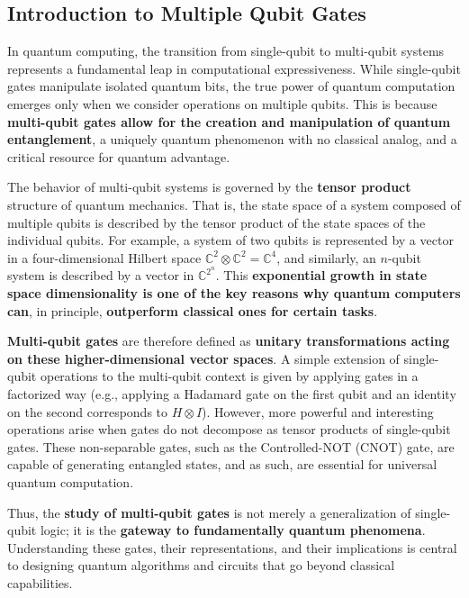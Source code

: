 \subsection{Introduction to Multiple Qubit Gates}

In quantum computing, the transition from single-qubit to multi-qubit systems represents a fundamental leap in computational expressiveness. While single-qubit gates manipulate isolated quantum bits, the true power of quantum computation emerges only when we consider operations on multiple qubits. This is because \textbf{multi-qubit gates allow for the creation and manipulation of quantum entanglement}, a uniquely quantum phenomenon with no classical analog, and a critical resource for quantum advantage.

\highspace
The behavior of multi-qubit systems is governed by the \textbf{tensor product} structure of quantum mechanics. That is, the state space of a system composed of multiple qubits is described by the tensor product of the state spaces of the individual qubits. For example, a system of two qubits is represented by a vector in a four-dimensional Hilbert space $ \mathbb{C}^{2} \otimes \mathbb{C}^{2} = \mathbb{C}^{4} $, and similarly, an $n$-qubit system is described by a vector in $ \mathbb{C}^{2^{n}} $. This \textbf{exponential growth in state space dimensionality is one of the key reasons why quantum computers can}, in principle, \textbf{outperform classical ones for certain tasks}.

\highspace
\textbf{Multi-qubit gates} are therefore defined as \textbf{unitary transformations acting on these higher-dimensional vector spaces}. A simple extension of single-qubit operations to the multi-qubit context is given by applying gates in a factorized way (e.g., applying a Hadamard gate on the first qubit and an identity on the second corresponds to $ H \otimes I $). However, more powerful and interesting operations arise when gates do not decompose as tensor products of single-qubit gates. These non-separable gates, such as the Controlled-NOT (CNOT) gate, are capable of generating entangled states, and as such, are essential for universal quantum computation.

\highspace
Thus, the \textbf{study of multi-qubit gates} is not merely a generalization of single-qubit logic; it is the \textbf{gateway to fundamentally quantum phenomena}. Understanding these gates, their representations, and their implications is central to designing quantum algorithms and circuits that go beyond classical capabilities.